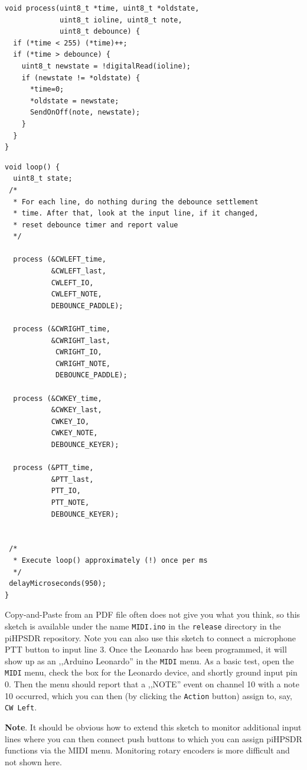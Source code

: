 \documentclass[12pt]{book}
\def\rett#1{\texttt{\color{red}#1}}
\def\bltt#1{\texttt{\color{blue}#1}}
\def\pH{pi\-HPSDR }
\begin{document}
\begin{small}
\begin{verbatim}
void process(uint8_t *time, uint8_t *oldstate,
             uint8_t ioline, uint8_t note,
             uint8_t debounce) {
  if (*time < 255) (*time)++;
  if (*time > debounce) {
    uint8_t newstate = !digitalRead(ioline);
    if (newstate != *oldstate) {
      *time=0;
      *oldstate = newstate;
      SendOnOff(note, newstate);
    }
  }
}
\end{verbatim}
\clearpage
\begin{verbatim}
void loop() {
  uint8_t state;
 /*
  * For each line, do nothing during the debounce settlement
  * time. After that, look at the input line, if it changed,
  * reset debounce timer and report value
  */

  process (&CWLEFT_time,
           &CWLEFT_last,
           CWLEFT_IO,
           CWLEFT_NOTE,
           DEBOUNCE_PADDLE);

  process (&CWRIGHT_time,
           &CWRIGHT_last,
            CWRIGHT_IO,
            CWRIGHT_NOTE,
            DEBOUNCE_PADDLE);

  process (&CWKEY_time,
           &CWKEY_last,
           CWKEY_IO,
           CWKEY_NOTE,
           DEBOUNCE_KEYER);

  process (&PTT_time,
           &PTT_last,
           PTT_IO,
           PTT_NOTE,
           DEBOUNCE_KEYER);


 /*
  * Execute loop() approximately (!) once per ms
  */
 delayMicroseconds(950);
}
\end{verbatim}
\end{small}
\clearpage
Copy-and-Paste from an PDF file often does not give you what you think, so
this sketch is available under the name \texttt{MIDI.ino} in the \texttt{release}
directory in the \pH repository. Note you can
also use this sketch to connect a microphone PTT button to input line 3. Once the
Leonardo has been programmed,
it will show up as an ,,Arduino Leonardo'' in the \bltt{MIDI} menu. As a basic test,
open the \bltt{MIDI} menu, check the box for the Leonardo device,
 and shortly ground input pin 0. Then the menu should report
that a ,,NOTE'' event on channel 10 with a note 10 occurred, which you can then
(by clicking the \rett{Action} button) assign to, say, \bltt{CW Left}.

\textbf{Note}. It should be obvious how to extend this sketch to monitor additional
input lines where you can then connect push buttons to which you can assign \pH
functions via the MIDI menu. Monitoring rotary encoders is more difficult and not
shown here.
\end{document}
